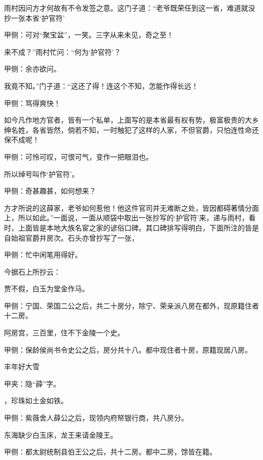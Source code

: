 \begin{parag}
    雨村因问方才何故有不令发签之意。这门子道：“老爷既荣任到这一省，难道就没抄一张本省‘护官符’\begin{note}甲侧：可对“聚宝盆”，一笑。三字从来未见，奇之至！\end{note}来不成？”雨村忙问：“何为‘护官符’？\begin{note}甲侧：余亦欲问。\end{note}我竟不知。”门子道：“这还了得！连这个不知，怎能作得长远！\begin{note}甲侧：骂得爽快！\end{note}如今凡作地方官者，皆有一个私单，上面写的是本省最有权有势，极富极贵的大乡绅名姓，各省皆然，倘若不知，一时触犯了这样的人家，不但官爵，只怕连性命还保不成呢！\begin{note}甲侧：可怜可叹，可恨可气，变作一把眼泪也。\end{note}所以绰号叫作‘护官符’。\begin{note}甲侧：奇甚趣甚，如何想来？\end{note}方才所说的这薛家，老爷如何惹他！他这件官司并无难断之处，皆因都碍著情分面上，所以如此。”一面说，一面从顺袋中取出一张抄写的‘护官符’来，递与雨村，看时，上面皆是本地大族名宦之家的谚俗口碑。其口碑排写得明白，下面所注的皆是自始祖官爵并房次。石头亦曾抄写了一张，\begin{note}甲侧：忙中闲笔用得好。\end{note}今据石上所抄云：
\end{parag}


\begin{poem}
    \begin{pl}贾不假，白玉为堂金作马。\end{pl}
    \begin{note}甲侧：宁国、荣国二公之后，共二十房分，除宁、荣亲派八房在都外，现原籍住者十二房。\end{note}

    \begin{pl}阿房宫，三百里，住不下金陵一个史。\end{pl}
    \begin{note}甲侧：保龄侯尚书令史公之后，房分共十八。都中现住者十房，原籍现居八房。\end{note}

    \begin{pl}丰年好大雪\end{pl}\begin{note}甲夹：隐“薛”字。\end{note} \begin{pl}，珍珠如土金如铁。\end{pl}

    \begin{note}甲侧：紫薇舍人薛公之后，现领内府帑银行商，共八房分。\end{note}

    \begin{pl}东海缺少白玉床，龙王来请金陵王。\end{pl}\begin{note}甲侧：都太尉统制县伯王公之后，共十二房。都中二房，馀皆在籍。\end{note}

\end{poem}


